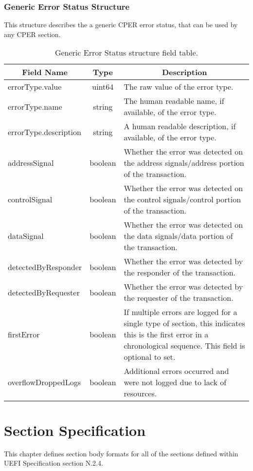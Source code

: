 \documentclass{report}
\newcommand*{\thead}[1]{\multicolumn{1}{|c|}{\bfseries #1}}
\newcommand*{\jsontable}[1]{
    \begin{table}[!ht]
    \label{#1}
    \centering
    \begin{adjustbox}{center}
    \begin{tabular}{|l|c|p{8cm}|}
    \hline
    \thead{Field Name} & \thead{Type} & \thead{Description} \\
    \hline
}
\newcommand*{\jsontableend}[1]{
    \hline
    \end{tabular}
    \end{adjustbox}
    \caption{#1}
    \label{table:#1}
    \end{table}
    \FloatBarrier
}
\begin{document}
\subsection{Generic Error Status Structure}
\label{subsection:genericerrorstatusstructure}
This structure describes the a generic CPER error status, that can be used by any CPER section.
\jsontable{table:genericerrorstatusstructure}
errorType.value & uint64 & The raw value of the error type.\\
errorType.name & string & The human readable name, if available, of the error type.\\
errorType.description & string & A human readable description, if available, of the error type.\\
\hline
addressSignal & boolean & Whether the error was detected on the address signals/address portion of the transaction.\\
\hline
controlSignal & boolean & Whether the error was detected on the control signals/control portion of the transaction.\\
\hline
dataSignal & boolean & Whether the error was detected on the data signals/data portion of the transaction.\\
\hline
detectedByResponder & boolean & Whether the error was detected by the responder of the transaction.\\
\hline
detectedByRequester & boolean & Whether the error was detected by the requester of the transaction.\\
\hline
firstError & boolean & If multiple errors are logged for a single type of section, this indicates this is the first error in a chronological sequence. This field is optional to set.\\
\hline
overflowDroppedLogs & boolean & Additional errors occurred and were not logged due to lack of resources.\\
\jsontableend{Generic Error Status structure field table.}

\chapter{Section Specification}
\label{chapter:sectionchapter}
This chapter defines section body formats for all of the sections defined within UEFI Specification section N.2.4.

\end{document}
